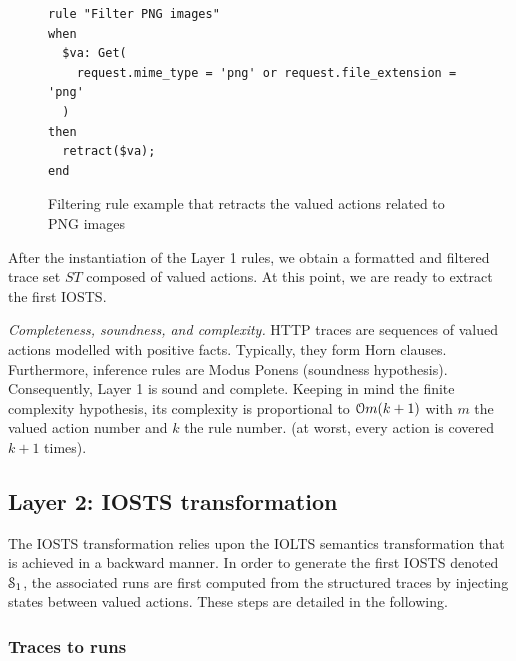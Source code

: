 \begin{figure}[ht]
\begin{framed}
\begin{BVerbatim}
rule "Filter PNG images"
when
  $va: Get(
    request.mime_type = 'png' or request.file_extension = 'png'
  )
then
  retract($va);
end
\end{BVerbatim}
\end{framed}

\caption{Filtering rule example that retracts the valued actions
related to PNG images}
\label{fig:layer1:filter}
\end{figure}

After the instantiation of the Layer 1 rules, we obtain a
formatted and filtered trace set $ST$ composed of valued actions.
At this point, we are ready to extract the first IOSTS.

\textit{Completeness, soundness, and complexity.} HTTP traces are
sequences of valued actions modelled with positive facts.
Typically, they form Horn clauses. Furthermore, inference rules
are Modus Ponens (soundness hypothesis). Consequently, Layer 1 is
sound and complete. Keeping in mind the finite complexity
hypothesis, its complexity is proportional to
$\EuScript{O}m(k+1)$ with $m$ the valued action number and $k$
the rule number. (at worst, every action is covered $k+1$ times).

\subsection{Layer 2: IOSTS transformation}
\label{sec:modelinf:webapps:L2}

The IOSTS transformation relies upon the IOLTS semantics
transformation that is achieved in a backward manner.  In order
to generate the first IOSTS denoted $\EuScript{S}_1$, the
associated runs are first computed from the structured traces by
injecting states between valued actions. These steps are detailed
in the following.

\subsubsection{Traces to runs}

